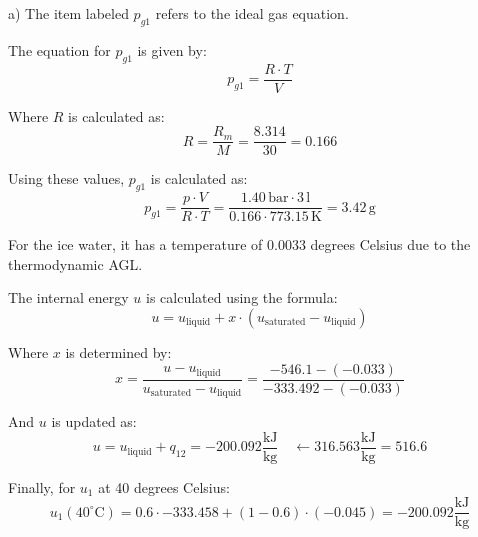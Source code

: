a) The item labeled \( p_{g1} \) refers to the ideal gas equation.

The equation for \( p_{g1} \) is given by:
\[ p_{g1} = \frac{R \cdot T}{V} \]

Where \( R \) is calculated as:
\[ R = \frac{R_m}{M} = \frac{8.314}{30} = 0.166 \]

Using these values, \( p_{g1} \) is calculated as:
\[ p_{g1} = \frac{p \cdot V}{R \cdot T} = \frac{1.40 \, \text{bar} \cdot 3 \, \text{l}}{0.166 \cdot 773.15 \, \text{K}} = 3.42 \, \text{g} \]

For the ice water, it has a temperature of 0.0033 degrees Celsius due to the thermodynamic AGL.

The internal energy \( u \) is calculated using the formula:
\[ u = u_{\text{liquid}} + x \cdot (u_{\text{saturated}} - u_{\text{liquid}}) \]

Where \( x \) is determined by:
\[ x = \frac{u - u_{\text{liquid}}}{u_{\text{saturated}} - u_{\text{liquid}}} = \frac{-546.1 - (-0.033)}{-333.492 - (-0.033)} \]

And \( u \) is updated as:
\[ u = u_{\text{liquid}} + q_{12} = -200.092 \frac{\text{kJ}}{\text{kg}} \quad \leftarrow 316.563 \frac{\text{kJ}}{\text{kg}} = 516.6 \]

Finally, for \( u_1 \) at 40 degrees Celsius:
\[ u_1 (40^\circ \text{C}) = 0.6 \cdot -333.458 + (1 - 0.6) \cdot (-0.045) = -200.092 \frac{\text{kJ}}{\text{kg}} \]